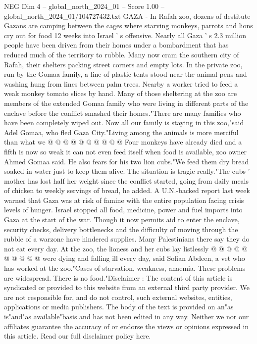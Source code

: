 \begin{textsample}{NEG Dim 4 – global\_north\_2024\_01 – Score 1.00 – global\_north\_2024\_01/104727432.txt}  \label{ex:f4_neg_124}
GAZA - In Rafah zoo, dozens of destitute Gazans are camping between the cages where starving monkeys, parrots and lions cry out for food 12 weeks into Israel ' s offensive.
Nearly all Gaza ' s 2.3 million people have been driven from their homes under a bombardment that has reduced much of the territory to rubble.
Many now cram the southern city of Rafah, their shelters packing street corners and empty lots.
In the private zoo, run by the Gomaa family, a line of plastic tents stood near the animal pens and washing hung from lines between palm trees.
Nearby a worker tried to feed a weak monkey tomato slices by hand.
Many of those sheltering at the zoo are members of the extended Gomaa family who were living in different parts of the enclave before the conflict smashed their homes."There are many families who have been completely wiped out.
Now all our family is staying in this zoo,"said Adel Gomaa, who fled Gaza City."Living among the animals is more merciful than what we @ @ @ @ @ @ @ @ @ @ Four monkeys have already died and a fifth is now so weak it can not even feed itself when food is available, zoo owner Ahmed Gomaa said.
He also fears for his two lion cubs."We feed them dry bread soaked in water just to keep them alive.
The situation is tragic really."The cubs ' mother has lost half her weight since the conflict started, going from daily meals of chicken to weekly servings of bread, he added.
A U.N.-backed report last week warned that Gaza was at risk of famine with the entire population facing crisis levels of hunger.
Israel stopped all food, medicine, power and fuel imports into Gaza at the start of the war.
Though it now permits aid to enter the enclave, security checks, delivery bottlenecks and the difficulty of moving through the rubble of a warzone have hindered supplies.
Many Palestinians there say they do not eat every day.
At the zoo, the lioness and her cubs lay listlessly @ @ @ @ @ @ @ @ @ @ were dying and falling ill every day, said Sofian Abdeen, a vet who has worked at the zoo."Cases of starvation, weakness, anaemia.
These problems are widespread.
There is no food."Disclaimer : The content of this article is syndicated or provided to this website from an external third party provider.
We are not responsible for, and do not control, such external websites, entities, applications or media publishers.
The body of the text is provided on an"as is"and"as available"basis and has not been edited in any way.
Neither we nor our affiliates guarantee the accuracy of or endorse the views or opinions expressed in this article.
Read our full disclaimer policy here.

\end{textsample}
